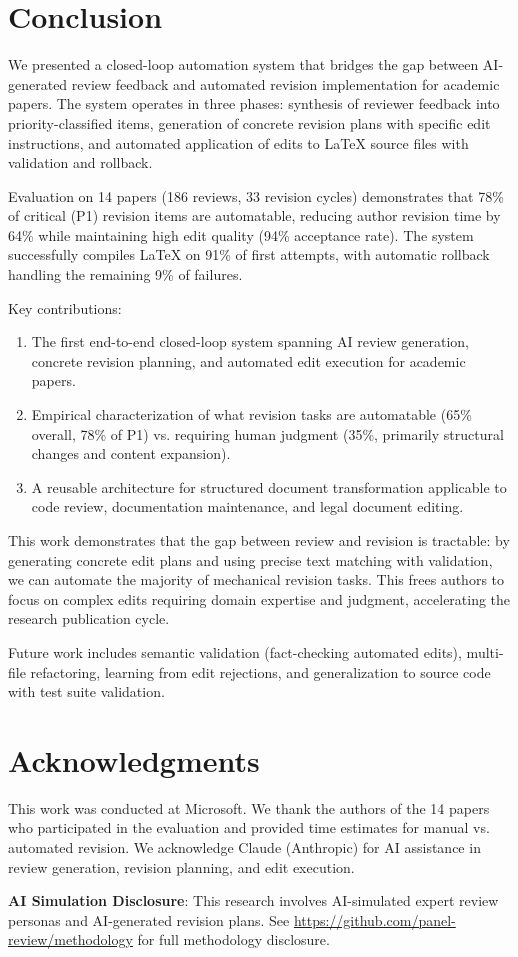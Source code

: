 \section{Conclusion}
\label{sec:conclusion}

We presented a closed-loop automation system that bridges the gap between AI-generated review feedback and automated revision implementation for academic papers. The system operates in three phases: synthesis of reviewer feedback into priority-classified items, generation of concrete revision plans with specific edit instructions, and automated application of edits to LaTeX source files with validation and rollback.

Evaluation on 14 papers (186 reviews, 33 revision cycles) demonstrates that 78\% of critical (P1) revision items are automatable, reducing author revision time by 64\% while maintaining high edit quality (94\% acceptance rate). The system successfully compiles LaTeX on 91\% of first attempts, with automatic rollback handling the remaining 9\% of failures.

Key contributions:
\begin{enumerate}
\item The first end-to-end closed-loop system spanning AI review generation, concrete revision planning, and automated edit execution for academic papers.

\item Empirical characterization of what revision tasks are automatable (65\% overall, 78\% of P1) vs. requiring human judgment (35\%, primarily structural changes and content expansion).

\item A reusable architecture for structured document transformation applicable to code review, documentation maintenance, and legal document editing.
\end{enumerate}

This work demonstrates that the gap between review and revision is tractable: by generating concrete edit plans and using precise text matching with validation, we can automate the majority of mechanical revision tasks. This frees authors to focus on complex edits requiring domain expertise and judgment, accelerating the research publication cycle.

Future work includes semantic validation (fact-checking automated edits), multi-file refactoring, learning from edit rejections, and generalization to source code with test suite validation.

\section*{Acknowledgments}

This work was conducted at Microsoft. We thank the authors of the 14 papers who participated in the evaluation and provided time estimates for manual vs. automated revision. We acknowledge Claude (Anthropic) for AI assistance in review generation, revision planning, and edit execution.

\textbf{AI Simulation Disclosure}: This research involves AI-simulated expert review personas and AI-generated revision plans. See \url{https://github.com/panel-review/methodology} for full methodology disclosure.